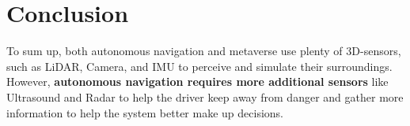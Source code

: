 \section{Conclusion}

To sum up, both autonomous navigation and metaverse use plenty of 3D-sensors, such as LiDAR, Camera, and IMU to perceive and simulate their surroundings. However, \textbf{autonomous navigation requires more additional sensors} like Ultrasound and Radar to help the driver keep away from danger and gather more information to help the system better make up decisions.